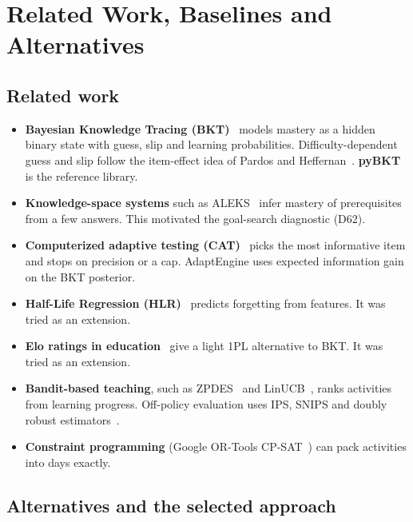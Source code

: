 \documentclass[11pt,a4paper]{article}
\begin{document}
\section{Related Work, Baselines and Alternatives}

\subsection{Related work}

\begin{itemize}
\item \textbf{Bayesian Knowledge Tracing (BKT)}~\cite{corbett1995} models mastery as a hidden binary state with guess, slip and learning probabilities. Difficulty-dependent guess and slip follow the item-effect idea of Pardos and Heffernan~\cite{pardos2011}. \textbf{pyBKT}~\cite{badrinath2021} is the reference library.
\item \textbf{Knowledge-space systems} such as ALEKS~\cite{falmagne2006} infer mastery of prerequisites from a few answers. This motivated the goal-search diagnostic (D62).
\item \textbf{Computerized adaptive testing (CAT)}~\cite{vanderlinden2010} picks the most informative item and stops on precision or a cap. AdaptEngine uses expected information gain on the BKT posterior.
\item \textbf{Half-Life Regression (HLR)}~\cite{settles2016} predicts forgetting from features. It was tried as an extension.
\item \textbf{Elo ratings in education}~\cite{pelanek2016} give a light 1PL alternative to BKT. It was tried as an extension.
\item \textbf{Bandit-based teaching}, such as ZPDES~\cite{clement2015} and LinUCB~\cite{li2010}, ranks activities from learning progress. Off-policy evaluation uses IPS, SNIPS and doubly robust estimators~\cite{dudik2011}.
\item \textbf{Constraint programming} (Google OR-Tools CP-SAT~\cite{ortools}) can pack activities into days exactly.
\end{itemize}

\subsection{Alternatives and the selected approach}
\end{document}
